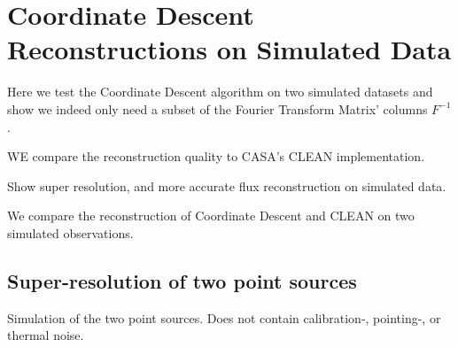 \section{Coordinate Descent Reconstructions on Simulated Data}
Here we test the Coordinate Descent algorithm on two simulated datasets and show we indeed only need a subset of the Fourier Transform Matrix' columns $F^{-1}$.

WE compare the reconstruction quality to CASA's CLEAN implementation.

Show super resolution, and more accurate flux reconstruction on simulated data.

We compare the reconstruction of Coordinate Descent and CLEAN on two simulated observations.

\subsection{Super-resolution of two point sources}

Simulation of the two point sources. Does not contain calibration-, pointing-, or thermal noise.

